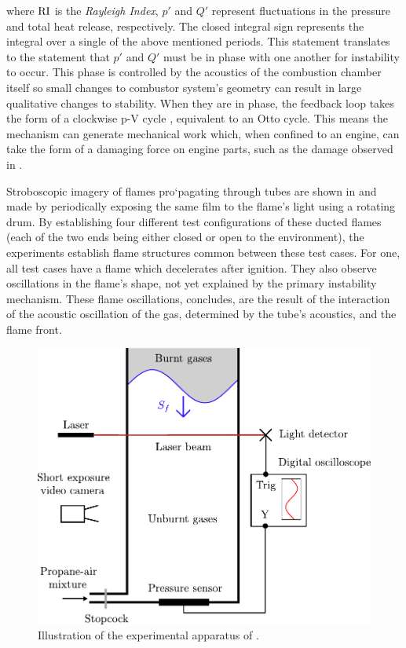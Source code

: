 where $\rm{RI}$ is the \emph{Rayleigh Index}, $p'$ and $Q'$ represent fluctuations in the pressure and total heat release, respectively. The closed integral sign represents the integral over a single of the above mentioned periods. This statement translates to the statement that $p'$ and $Q'$ must be in phase with one another for instability to occur. This phase is controlled by the acoustics of the combustion chamber itself so small changes to combustor system's geometry can result in large qualitative changes to stability. When they are in phase, the feedback loop takes the form of a clockwise p-V cycle \cite{polifke2004CombustionInstabilities}, equivalent to an Otto cycle. This means the mechanism can generate mechanical work which, when confined to an engine, can take the form of a damaging force on engine parts, such as the damage observed in \cite{lieuwen2006CombustionInstabilitiesGas}.

Stroboscopic imagery of flames pro`pagating through tubes are shown in \cite{guenoche1964ChapterFlamePropagation} and made by periodically exposing the same film to the flame's light using a rotating drum. By establishing four different test configurations of these ducted flames (each of the two ends being either closed or open to the environment), the experiments establish flame structures common between these test cases. For one, all test cases have a flame which decelerates after ignition. They also observe oscillations in the flame's shape, not yet explained by the primary instability mechanism. These flame oscillations, \cite{guenoche1964ChapterFlamePropagation} concludes, are the result of the interaction of the acoustic oscillation of the gas, determined by the tube's acoustics, and the flame front.

\begin{figure}[t]
\centering
\includegraphics[scale=0.6]{assets/imgs/Searby-92.pdf}
\caption{Illustration of the experimental apparatus of \cite{searby1992AcousticInstabilityPremixed}.}
\label{fig:searby-experiment}
\end{figure}


